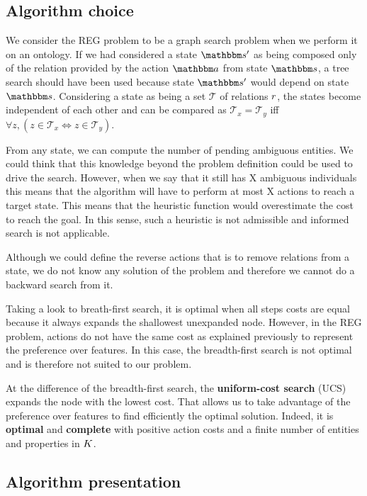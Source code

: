 \subsection{Algorithm choice}

We consider the REG problem to be a graph search problem when we perform it on an ontology. If we had considered a state $\state'$ as being composed only of the relation provided by the action $\action$ from state $\state$, a tree search should have been used because state $\state'$ would depend on state $\state$. Considering a state as being a set $\mathcal{T}$ of relations $r$, the states become independent of each other and can be compared as $\mathcal{T}_x = \mathcal{T}_y$ iff $\forall{z},(z\in \mathcal{T}_x \Leftrightarrow z\in \mathcal{T}_y)$.

From any state, we can compute the number of pending ambiguous entities. We could think that this knowledge beyond the problem definition could be used to drive the search. However, when we say that it still has X ambiguous individuals this means that the algorithm will have to perform at most X actions to reach a target state. This means that the heuristic function would overestimate the cost to reach the goal. In this sense, such a heuristic is not admissible and informed search is not applicable.

Although we could define the reverse actions that is to remove relations from a state, we do not know any solution of the problem and therefore we cannot do a backward search from it.

Taking a look to breath-first search, it is optimal when all steps costs are equal because it always expands the shallowest unexpanded node. However, in the REG problem, actions do not have the same cost as explained previously to represent the preference over features. In this case, the breadth-first search is not optimal and is therefore not suited to our problem.

At the difference of the breadth-first search, the \textbf{uniform-cost search} (UCS) expands the node with the lowest cost. That allows us to take advantage of the preference over features to find efficiently the optimal solution. Indeed, it is \textbf{optimal} and \textbf{complete} with positive action costs and a finite number of entities and properties in $K$.

\subsection{Algorithm presentation}

